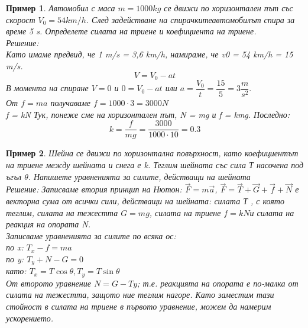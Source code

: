 \documentclass[fleqn]{article}
\newtheorem{example}{Пример}[subsection]
\begin{document}
\begin{example}
Автомобил с маса $m = 1000 kg$ се движи по хоризонтален път със скорост $V_0 = 54 km/h$. След задействане на спирачкитеавтомобилът спира за време 5 s. Определете силата на триене и коефициента на триене.\\
Решение: \\
Като имаме предвид, че 1 m/s = 3,6 km/h, намираме, че v0 = 54 km/h = 15 m/s. \\
$$V = V_0 - at$$
В момента на спиране $V = 0$ и $0 = V_0 - at$ или $a = \dfrac{V_0}{t} = \dfrac{15}{5} = 3 \dfrac{m}{s^2}. $\\
От $f = ma$ получаваме $f =1000 \cdot 3 = 3000 N$ \\
f = kN Тук, понеже сме на хоризонтален път, N = mg и f = kmg. Последно:
$$k = \dfrac{f}{mg} = \dfrac{3000}{1000 \cdot 10} = 0.3$$
\end{example}

\begin{example}
Шейна се движи по хоризонтална повърхност, като коефициентът на триене между шейната и снега е k. Теглим шейната със сила Т насочена под ъгъл $\theta$. Напишете уравненията за силите, действащи на шейната \\
Решение: 
Записваме втория принцип на Нютон: $\vec{F} = m \vec{a}$, $\vec{F} = \vec{T} + \vec{G} + \vec{f} + \vec{N}$ е векторна сума от всички сили, действащи на шейната: силата Т , с която теглим, силата на тежестта $G = mg$, силата на триене $f = kN$и силата на реакция на опората N. \\
Записваме уравненията за силите по всяка ос: \\
по x: $T_x - f = ma $\\
по y: $ T_y + N - G = 0$\\
като: $ T_x = T \cos{\theta}, T_y = T \sin{\theta}$ \\
От второто уравнение $N = G - Ty$; т.е. реакцията на опората е по-малка от силата на тежестта, защото ние теглим нагоре. Като заместим тази стойност в силата на триене в първото уравнение, можем да намерим ускорението.
\end{example}
\end{document}
